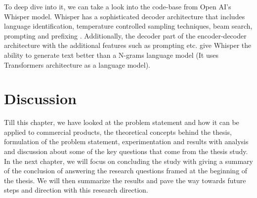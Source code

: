 To deep dive into it, we can take a look into the code-base from Open AI's Whisper model. Whisper has a sophisticated decoder architecture that includes language identification, temperature controlled sampling techniques, beam search, prompting and prefixing \cite{radford2023robust}. Additionally, the decoder part of the encoder-decoder architecture with the additional features such as prompting etc. give Whisper the ability to generate text better than a N-grams language model (It uses Transformers architecture as a language model).

\section{Discussion}

Till this chapter, we have looked at the problem statement and how it can be applied to commercial products, the theoretical concepts behind the thesis, formulation of the problem statement, experimentation and results with analysis and discussion about some of the key questions that come from the thesis study. In the next chapter, we will focus on concluding the study with giving a summary of the conclusion of answering the research questions framed at the beginning of the thesis. We will then summarize the results and pave the way towards future steps and direction with this research direction.
